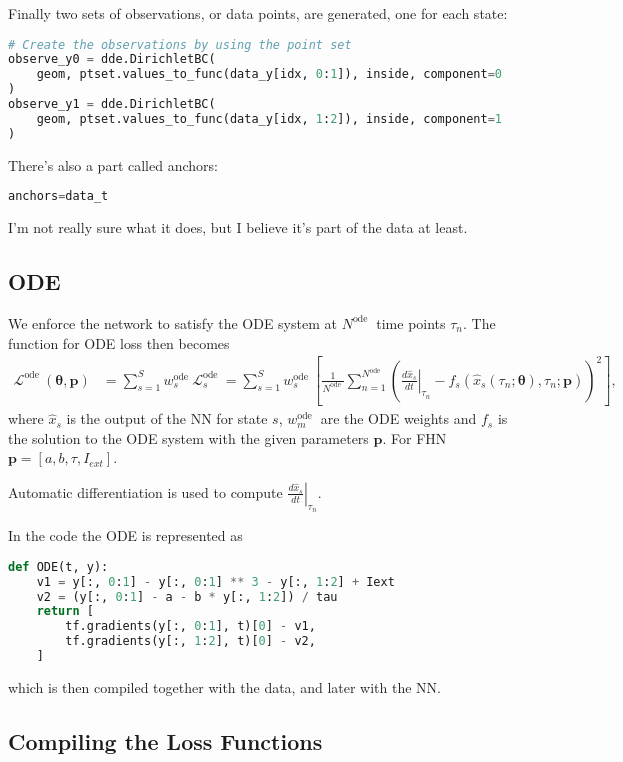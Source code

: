 \documentclass[a4paper]{article}
\begin{document}
Finally two sets of observations, or data points, are generated, one for each state:
\begin{lstlisting}[language=python]
# Create the observations by using the point set
observe_y0 = dde.DirichletBC(
	geom, ptset.values_to_func(data_y[idx, 0:1]), inside, component=0
)
observe_y1 = dde.DirichletBC(
	geom, ptset.values_to_func(data_y[idx, 1:2]), inside, component=1
)
\end{lstlisting}

There's also a part called anchors:
\begin{lstlisting}[language=python]
anchors=data_t
\end{lstlisting}
I'm not really sure what it does, but I believe it's part of the data at least. 


\subsection{ODE}

We enforce the network to satisfy the ODE system at $N^{\text {ode }}$ time points $\tau_{n}$.
The function for ODE loss then becomes 
\begin{align}
\mathcal{L}^{\text {ode }}(\boldsymbol{\theta}, \mathbf{p}) 
&= \sum_{s=1}^{S} w_{s}^{\text {ode }} \mathcal{L}_{s}^{\text {ode }}
= \sum_{s=1}^{S} w_{s}^{\text {ode }} \left[\frac{1}{N^{\text {ode }}} \sum_{n=1}^{N^{\text {ode }}}\left(\left. \frac{d \hat{x}_{s}}{d t}\right|_{\tau_{n}} - f_{s}\left(\hat{x}_{s}\left(\tau_{n} ; \boldsymbol{\theta}\right), \tau_{n} ; \mathbf{p}\right)\right)^{2}\right],
\end{align}
where $\hat{x}_{s}$ is the output of the NN for state $s$, $w_{m}^{\text {ode }}$ are the ODE weights and $f_s$ is the solution to the ODE system with the given parameters $\mathbf{p}$. For FHN $\mathbf{p} = [a, b, \tau, I_{ext}]$.

Automatic differentiation is used to compute $\left. \frac{d \hat{x}_{s}}{d t}\right|_{\tau_{n}}$. 

In the code the ODE is represented as
\begin{lstlisting}[language=python]
def ODE(t, y):
	v1 = y[:, 0:1] - y[:, 0:1] ** 3 - y[:, 1:2] + Iext
	v2 = (y[:, 0:1] - a - b * y[:, 1:2]) / tau
	return [
		tf.gradients(y[:, 0:1], t)[0] - v1,
		tf.gradients(y[:, 1:2], t)[0] - v2,
	]
\end{lstlisting}
which is then compiled together with the data, and later with the NN. 


\subsection{Compiling the Loss Functions}
\end{document}
